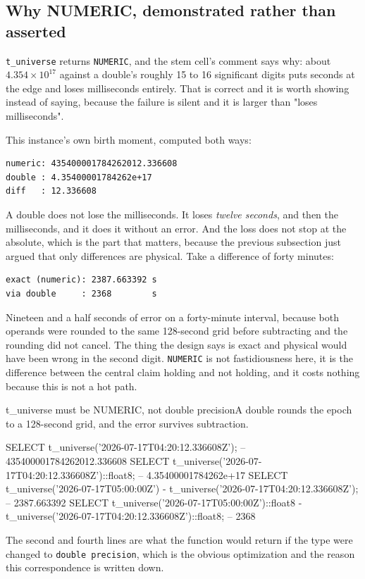 \subsection{Why NUMERIC, demonstrated rather than asserted}

\texttt{t\_universe} returns \texttt{NUMERIC}, and the stem cell's comment says why: about $4.354 \times 10^{17}$ against a double's roughly 15 to 16 significant digits puts seconds at the edge and loses milliseconds entirely. That is correct and it is worth showing instead of saying, because the failure is silent and it is larger than "loses milliseconds".

This instance's own birth moment, computed both ways:

\begin{verbatim}
numeric: 435400001784262012.336608
double : 4.35400001784262e+17
diff   : 12.336608
\end{verbatim}

A double does not lose the milliseconds. It loses \emph{twelve seconds}, and then the milliseconds, and it does it without an error. And the loss does not stop at the absolute, which is the part that matters, because the previous subsection just argued that only differences are physical. Take a difference of forty minutes:

\begin{verbatim}
exact (numeric): 2387.663392 s
via double     : 2368        s
\end{verbatim}

Nineteen and a half seconds of error on a forty-minute interval, because both operands were rounded to the same 128-second grid before subtracting and the rounding did not cancel. The thing the design says is exact and physical would have been wrong in the second digit. \texttt{NUMERIC} is not fastidiousness here, it is the difference between the central claim holding and not holding, and it costs nothing because this is not a hot path.

\begin{Correspondence}{t\_universe must be NUMERIC, not double precision}{A double rounds the epoch to a 128-second grid, and the error survives subtraction.}
\begin{Check}
SELECT t_universe('2026-07-17T04:20:12.336608Z');           -- 435400001784262012.336608
SELECT t_universe('2026-07-17T04:20:12.336608Z')::float8;   -- 4.35400001784262e+17
SELECT t_universe('2026-07-17T05:00:00Z')
     - t_universe('2026-07-17T04:20:12.336608Z');           -- 2387.663392
SELECT t_universe('2026-07-17T05:00:00Z')::float8
     - t_universe('2026-07-17T04:20:12.336608Z')::float8;   -- 2368
\end{Check}
The second and fourth lines are what the function would return if the type were changed to \texttt{double precision}, which is the obvious optimization and the reason this correspondence is written down.
\end{Correspondence}

